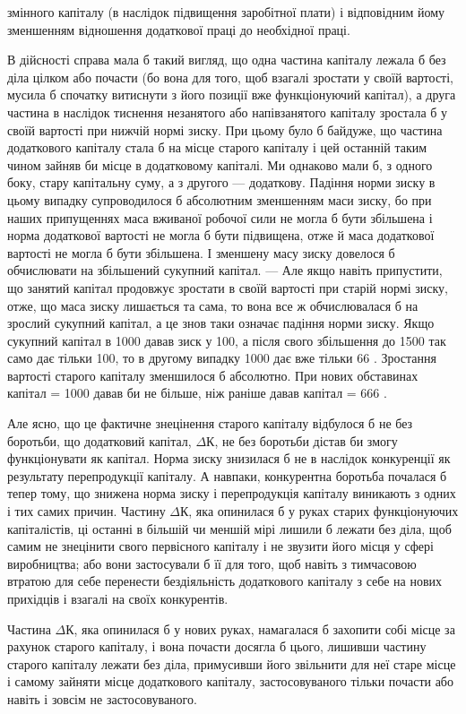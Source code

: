 \parcont{}  %
змінного капіталу (в наслідок підвищення заробітної плати) і відповідним
йому зменшенням відношення додаткової праці до
необхідної праці.

В дійсності справа мала б такий вигляд, що одна частина капіталу
лежала б без діла цілком або почасти (бо вона для того, щоб
взагалі зростати у своїй вартості, мусила б спочатку витиснути з
його позиції вже функціонуючий капітал), а друга частина в наслідок
тиснення незанятого або напівзанятого капіталу зростала б
у своїй вартості при нижчій нормі зиску. При цьому було б байдуже,
що частина додаткового капіталу стала б на місце старого капіталу
і цей останній таким чином зайняв би місце в додатковому
капіталі. Ми однаково мали б, з одного боку, стару капітальну
суму, а з другого — додаткову. Падіння норми зиску в цьому
випадку супроводилося б абсолютним зменшенням маси зиску, бо
при наших припущеннях маса вживаної робочої сили не могла б
бути збільшена і норма додаткової вартості не могла б бути підвищена,
отже й маса додаткової вартості не могла б бути збільшена.
І зменшену масу зиску довелося б обчислювати на збільшений
сукупний капітал. — Але якщо навіть припустити, що занятий
капітал продовжує зростати в своїй вартості при старій нормі
зиску, отже, що маса зиску лишається та сама, то вона все ж
обчислювалася б на зрослий сукупний капітал, а це знов таки
означає падіння норми зиску. Якщо сукупний капітал в 1000 давав
зиск у 100, а після свого збільшення до 1500 так само дає
тільки 100, то в другому випадку 1000 дає вже тільки 66 . Зростання
вартості старого капіталу зменшилося б абсолютно. При
нових обставинах капітал = 1000 давав би не більше, ніж раніше
давав капітал = 666 .

Але ясно, що це фактичне знецінення старого капіталу
відбулося б не без боротьби, що додатковий капітал, $ΔК$, не без
боротьби дістав би змогу функціонувати як капітал. Норма зиску
знизилася б не в наслідок конкуренції як результату перепродукції
капіталу. А навпаки, конкурентна боротьба почалася б тепер
тому, що знижена норма зиску і перепродукція капіталу виникають
з одних і тих самих причин. Частину $ΔК$, яка опинилася б
у руках старих функціонуючих капіталістів, ці останні в більшій
чи меншій мірі лишили б лежати без діла, щоб самим не знецінити
свого первісного капіталу і не звузити його місця у
сфері виробництва; або вони застосували б її для того, щоб навіть
з тимчасовою втратою для себе перенести бездіяльність
додаткового капіталу з себе на нових прихідців і взагалі на
своїх конкурентів.

Частина $ΔК$, яка опинилася б у нових руках, намагалася б
захопити собі місце за рахунок старого капіталу, і вона почасти
досягла б цього, лишивши частину старого капіталу лежати
без діла, примусивши його звільнити для неї старе місце і самому
зайняти місце додаткового капіталу, застосовуваного тільки
почасти або навіть і зовсім не застосовуваного.
